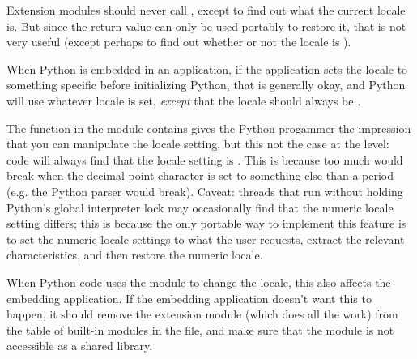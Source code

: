 Extension modules should never call , except to
find out what the current locale is.  But since the return value can
only be used portably to restore it, that is not very useful (except
perhaps to find out whether or not the locale is ).

When Python is embedded in an application, if the application sets the
locale to something specific before initializing Python, that is
generally okay, and Python will use whatever locale is set,
\emph{except} that the  locale should always be
.

The  function in the  module contains
gives the Python progammer the impression that you can manipulate the
 locale setting, but this not the case at the \C{}
level: \C{} code will always find that the  locale
setting is .  This is because too much would break when the
decimal point character is set to something else than a period
(e.g. the Python parser would break).  Caveat: threads that run
without holding Python's global interpreter lock may occasionally find
that the numeric locale setting differs; this is because the only
portable way to implement this feature is to set the numeric locale
settings to what the user requests, extract the relevant
characteristics, and then restore the  numeric locale.

When Python code uses the  module to change the locale,
this also affects the embedding application.  If the embedding
application doesn't want this to happen, it should remove the
 extension module (which does all the work) from the
table of built-in modules in the  file, and make sure
that the  module is not accessible as a shared library.
